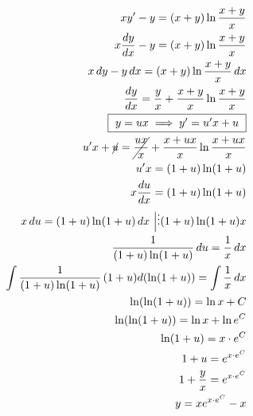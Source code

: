 \documentclass[../rgr_2.tex]{subfiles}
\begin{document}
\Solution

\begin{align}
	xy'-y=(x+y)\ln\frac{x+y}{x} \\
	x\frac{dy}{dx}-y=(x+y)\ln\frac{x+y}{x} \\
	x\,dy-y\,dx=(x+y)\ln\frac{x+y}{x}\,dx \\
	\frac{dy}{dx}=\frac{y}{x}+\frac{x+y}{x}\ln\frac{x+y}{x} \\
	\fbox{
		$
			y=ux \implies y'=u'x+u
		$
	} \\
	u'x+\cancel{u}=\cancel{\frac{ux}{x}}+\frac{x+ux}{x}\ln\frac{x+ux}{x} \\
	u'x=(1+u)\ln(1+u) \\
	x\frac{du}{dx}=(1+u)\ln(1+u) \\
	x\,du=(1+u)\ln(1+u)\,dx ~\Big|\vdots (1+u)\ln(1+u)x \\
	\frac{1}{(1+u)\ln(1+u)}\,du=\frac{1}{x}\,dx \\
	\int\frac{1}{(1+u)\ln(1+u)}\,(1+u)d(\ln(1+u))=\int\frac{1}{x}\,dx \\
	\ln(\ln(1+u))=\ln x+C \\
	\ln(\ln(1+u))=\ln x+\ln e^C \\
	\ln(1+u)=x\cdot e^C \\
	1+u=e^{x\cdot e^C} \\
	1+\frac{y}{x}=e^{x\cdot e^C} \\
	y=xe^{x\cdot e^C}-x %
\end{align}

\end{document}
